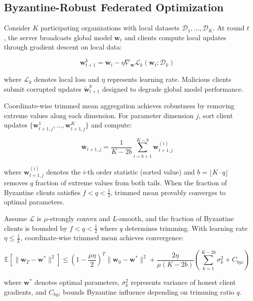 \subsection{Byzantine-Robust Federated Optimization}

Consider $K$ participating organizations with local datasets $\mathcal{D}_1, \ldots, \mathcal{D}_K$. At round $t$, the server broadcasts global model $\mathbf{w}_t$ and clients compute local updates through gradient descent on local data:

\begin{equation}
\mathbf{w}_{t+1}^k = \mathbf{w}_t - \eta \nabla_{\mathbf{w}} \mathcal{L}_k(\mathbf{w}_t; \mathcal{D}_k)
\end{equation}

where $\mathcal{L}_k$ denotes local loss and $\eta$ represents learning rate. Malicious clients submit corrupted updates $\tilde{\mathbf{w}}_{t+1}^k$ designed to degrade global model performance.

Coordinate-wise trimmed mean aggregation achieves robustness by removing extreme values along each dimension. For parameter dimension $j$, sort client updates $\{\mathbf{w}_{t+1,j}^1, \ldots, \mathbf{w}_{t+1,j}^K\}$ and compute:

\begin{equation}
\bar{\mathbf{w}}_{t+1,j} = \frac{1}{K - 2b} \sum_{i=b+1}^{K-b} \mathbf{w}_{t+1,j}^{(i)}
\end{equation}

where $\mathbf{w}_{t+1,j}^{(i)}$ denotes the $i$-th order statistic (sorted value) and $b = \lfloor K \cdot q \rfloor$ removes $q$ fraction of extreme values from both tails. When the fraction of Byzantine clients satisfies $f < q < \frac{1}{2}$, trimmed mean provably converges to optimal parameters.

\begin{theorem}
\label{thm:byzantine_convergence}
Assume $\mathcal{L}$ is $\mu$-strongly convex and $L$-smooth, and the fraction of Byzantine clients is bounded by $f < q < \frac{1}{2}$ where $q$ determines trimming. With learning rate $\eta \leq \frac{1}{L}$, coordinate-wise trimmed mean achieves convergence:

\begin{equation}
\mathbb{E}[\|\mathbf{w}_T - \mathbf{w}^*\|^2] \leq \left(1 - \frac{\mu\eta}{2}\right)^T \|\mathbf{w}_0 - \mathbf{w}^*\|^2 + \frac{2\eta}{\mu(K-2b)}\left(\sum_{k=1}^{K-2b} \sigma_k^2 + C_{byz}\right)
\end{equation}

where $\mathbf{w}^*$ denotes optimal parameters, $\sigma_k^2$ represents variance of honest client gradients, and $C_{byz}$ bounds Byzantine influence depending on trimming ratio $q$.
\end{theorem}

